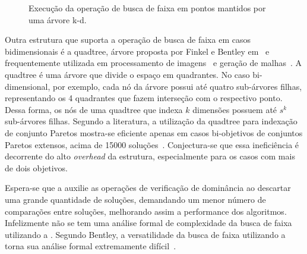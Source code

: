 \begin{figure}[ht]
\begin{minipage}[t]{0.48\textwidth}
    \caption{Execução da operação de busca de faixa em pontos mantidos por uma árvore k-d.}
    \label{img:pts-kdt-query}
  \end{minipage}
\end{figure}

Outra estrutura que suporta a operação de busca de faixa em casos bidimensionais é a quadtree,
árvore proposta por Finkel e Bentley em~\cite{finkel1974quad}
e frequentemente utilizada em processamento de imagens~\cite{de1997computational} e geração de malhas~\cite{cheng2012delaunay}.
A quadtree é uma árvore que divide o espaço em quadrantes.
No caso bi-dimensional, por exemplo, cada nó da árvore possui até quatro sub-árvores filhas, representando os 4 quadrantes
que fazem interseção com o respectivo ponto.
Dessa forma, os nós de uma quadtree que indexa $k$ dimensões possuem até $s^k$ sub-árvores filhas.
Segundo a literatura, a utilização da quadtree para indexação de conjunto Paretos mostra-se eficiente
apenas em casos bi-objetivos de conjuntos Paretos extensos, acima de 15000 soluções~\cite{mostaghim2005quad}.
Conjectura-se que essa ineficiência é decorrente do alto \emph{overhead} da estrutura, especialmente para os casos com mais de dois objetivos.

Espera-se que a \kdtree{} auxilie as operações de verificação de dominância
ao descartar uma grande quantidade de soluções, demandando um menor número
de comparações entre soluções, melhorando assim a performance dos algoritmos.
Infelizmente não se tem uma análise formal de complexidade da busca de faixa
utilizando a \kdtree{}. Segundo Bentley, a versatilidade da busca de faixa
utilizando a \kdtree{} torna sua análise formal extremamente difícil~\cite{bentley1975}.

